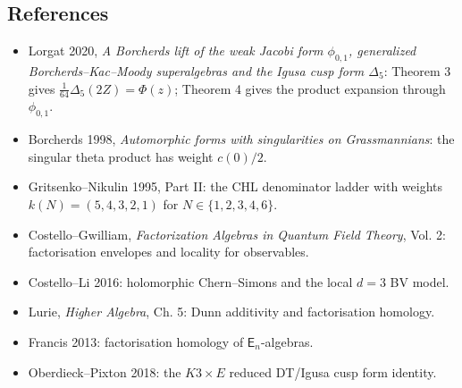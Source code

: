 \subsection*{References}

\begin{itemize}[leftmargin=1.5em]
\item Lorgat 2020, \emph{A Borcherds lift of the weak Jacobi form
 \(\phi_{0,1}\), generalized Borcherds--Kac--Moody superalgebras and
 the Igusa cusp form \(\Delta_5\)}: Theorem 3 gives
 \(\frac{1}{64}\Delta_5(2Z)=\Phi(z)\); Theorem 4 gives the product
 expansion through \(\phi_{0,1}\).
\item Borcherds 1998, \emph{Automorphic forms with singularities on
 Grassmannians}: the singular theta product has weight \(c(0)/2\).
\item Gritsenko--Nikulin 1995, Part II: the CHL denominator ladder with
 weights \(k(N)=(5,4,3,2,1)\) for \(N\in\{1,2,3,4,6\}\).
\item Costello--Gwilliam, \emph{Factorization Algebras in Quantum Field
 Theory}, Vol. 2: factorisation envelopes and locality for observables.
\item Costello--Li 2016: holomorphic Chern--Simons and the local
 \(d=3\) BV model.
\item Lurie, \emph{Higher Algebra}, Ch. 5: Dunn additivity and
 factorisation homology.
\item Francis 2013: factorisation homology of \(\mathsf E_n\)-algebras.
\item Oberdieck--Pixton 2018: the \(K3\times E\) reduced DT/Igusa cusp
 form identity.
\end{itemize}
